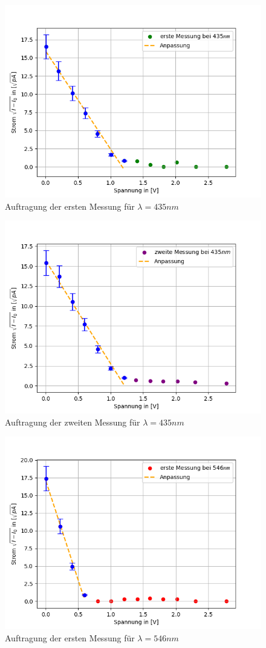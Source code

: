\documentclass{article}
\begin{document}
\begin{figure}[h!]
  \centering
  \includegraphics[width=.8\linewidth]{402_435nm_a.png}
  \caption{Auftragung der ersten Messung für $ \lambda =435nm$}
  \label{fig:wellenlaenge_435nm_a}
\end{figure}

\begin{figure}[h!]
  \centering
  \includegraphics[width=.8\linewidth]{402_435nm_b.png}
  \caption{Auftragung der zweiten Messung für $\lambda =435nm$}
  \label{fig:wellenlaenge_435nm_b}
\end{figure}

\begin{figure}[h!]
  \centering
  \includegraphics[width=.8\linewidth]{402_546nm_a.png}
  \caption{Auftragung der ersten Messung für $ \lambda =546nm$}
  \label{fig:wellenlaenge_546nm_a}
\end{figure}
\end{document}
